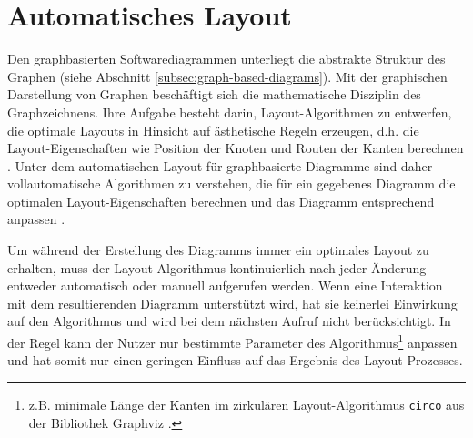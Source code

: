 


\section{Automatisches Layout}
\label{sec:automatic-layout}

Den graphbasierten Softwarediagrammen unterliegt die abstrakte Struktur des Graphen (siehe Abschnitt \ref{subsec:graph-based-diagrams}). Mit der graphischen Darstellung von Graphen beschäftigt sich die mathematische Disziplin des Graphzeichnens. Ihre Aufgabe besteht darin, Layout-Algorithmen zu entwerfen, die optimale Layouts in Hinsicht auf ästhetische Regeln erzeugen, d.h. die Layout-Eigenschaften wie Position der Knoten und Routen der Kanten berechnen \cite{Eichelberger05Aesthetics, Arvo02Techniques, Siebenhaller03Automatisches, Maier12A-Pattern-based}. Unter dem automatischen Layout für graphbasierte Diagramme sind daher vollautomatische Algorithmen zu verstehen, die für ein gegebenes Diagramm die optimalen Layout-Eigenschaften berechnen und das Diagramm entsprechend anpassen \cite{Fuhrmann11On-the-Pragmatics}.

Um während der Erstellung des Diagramms immer ein optimales Layout zu erhalten, muss der Layout-Algorithmus kontinuierlich nach jeder Änderung entweder automatisch oder manuell aufgerufen werden. Wenn eine Interaktion mit dem resultierenden Diagramm unterstützt wird, hat sie keinerlei Einwirkung auf den Algorithmus und wird bei dem nächsten Aufruf nicht berücksichtigt. In der Regel kann der Nutzer nur bestimmte Parameter des Algorithmus\footnote{z.B. minimale Länge der Kanten im zirkulären Layout-Algorithmus \lstinline{circo} aus der Bibliothek Graphviz \cite{NorthGansner14Dot-Manual}.} anpassen und hat somit nur einen geringen Einfluss auf das Ergebnis des Layout-Prozesses.

